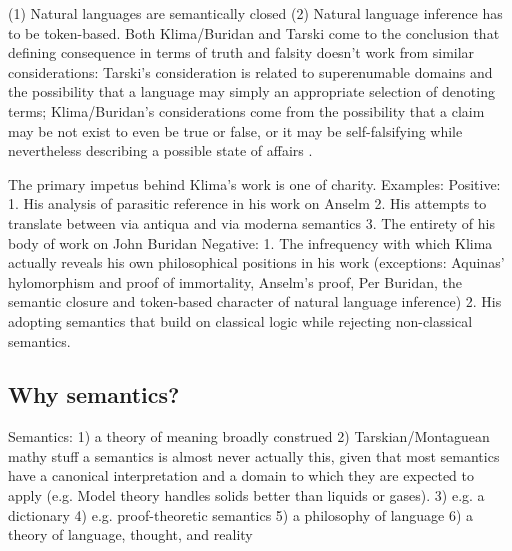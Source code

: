 \documentclass[]{article}
\begin{document}

(1) Natural languages are semantically closed (2) Natural language inference has to be token-based.
Both Klima/Buridan and Tarski come to the conclusion that defining consequence in terms of truth and falsity doesn't work from similar considerations: Tarski's consideration is related to superenumable domains and the possibility that a language may simply an appropriate selection of denoting terms; Klima/Buridan's considerations come from the possibility that a claim may be not exist to even be true or false, or it may be self-falsifying while nevertheless describing a possible state of affairs \autocite[96]{Klima2004}.

The primary impetus behind Klima's work is one of charity.
Examples: 
Positive:
1. His analysis of parasitic reference in his work on Anselm
2. His attempts to translate between via antiqua and via moderna semantics
3. The entirety of his body of work on John Buridan
Negative:
1. The infrequency with which Klima actually reveals his own philosophical positions in his work (exceptions: 
Aquinas' hylomorphism and proof of immortality, 
Anselm's proof, 
Per Buridan, the semantic closure and token-based character of natural language inference)
2. His adopting semantics that build on classical logic while rejecting non-classical semantics.



\subsection{Why semantics?}
Semantics: 
1) a theory of meaning broadly construed
2) Tarskian/Montaguean mathy stuff
a semantics is almost never actually this, given that most semantics have a canonical interpretation and a domain to which they are expected to apply (e.g. Model theory handles solids better than liquids or gases).
3) e.g. a dictionary
4) e.g. proof-theoretic semantics
5) a philosophy of language
6) a theory of language, thought, and reality
\end{document}
